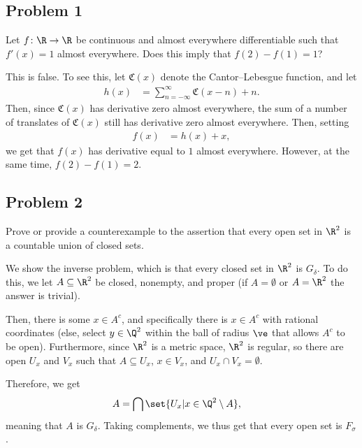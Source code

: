 \documentclass[10pt]{mypackage}
\begin{document}
\subsection{Problem 1}%
\begin{problem}
  Let $f\colon \R\rightarrow \R$ be continuous and almost everywhere differentiable such that $f'(x) = 1$ almost everywhere. Does this imply that $f(2)-f(1) = 1$?
\end{problem}
This is false. To see this, let $ \mathfrak{C}(x) $ denote the Cantor--Lebesgue function, and let
\begin{align*}
  h(x) &= \sum_{n=-\infty}^{\infty} \mathfrak{C}\left( x - n \right) + n.
\end{align*}
Then, since $\mathfrak{C}(x)$ has derivative zero almost everywhere, the sum of a number of translates of $\mathfrak{C}(x)$ still has derivative zero almost everywhere. Then, setting
\begin{align*}
  f(x) &= h(x) + x,
\end{align*}
we get that $f(x)$ has derivative equal to $1$ almost everywhere. However, at the same time, $f(2) - f(1) = 2$.
\subsection{Problem 2}%
\begin{problem}
  Prove or provide a counterexample to the assertion that every open set in $\R^2$ is a countable union of closed sets.
\end{problem}
We show the inverse problem, which is that every closed set in $\R^2$ is $G_{\delta}$. To do this, we let $A\subseteq \R^2$ be closed, nonempty, and proper (if $A = \emptyset$ or $A = \R^2$ the answer is trivial).\newline

Then, there is some $x\in A^{c}$, and specifically there is $x\in A^{c}$ with rational coordinates (else, select $y\in \Q^2$ within the ball of radius $\ve$ that allows $A^{c}$ to be open). Furthermore, since $\R^2$ is a metric space, $\R^2$ is regular, so there are open $U_{x}$ and $V_x$ such that $A\subseteq U_x$, $x\in V_x$, and $U_x\cap V_x = \emptyset$.\newline

Therefore, we get
\begin{align*}
  A &= \bigcap \set{U_x | x\in \Q^2\setminus A},
\end{align*}
meaning that $A$ is $G_{\delta}$. Taking complements, we thus get that every open set is $F_{\sigma}$.
\end{document}

